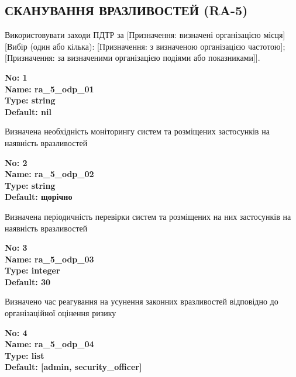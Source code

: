 \documentclass{article}
\begin{document}
\subsection{СКАНУВАННЯ ВРАЗЛИВОСТЕЙ (RA-5)}
Використовувати заходи ПДТР за [Призначення: визначені організацією місця] [Вибір (один або кілька): [Призначення: з визначеною організацією частотою]; [Призначення: за визначеними організацією подіями або показниками]].

\vspace{10pt}
{\footnotesize\bfseries
No: 1\\
Name: ra\_\allowbreak{}5\_\allowbreak{}odp\_\allowbreak{}01\\
Type: string\\
Default: nil
}

{\footnotesize Визначена необхідність моніторингу систем та розміщених застосунків на наявність вразливостей}


{\footnotesize\bfseries
No: 2\\
Name: ra\_\allowbreak{}5\_\allowbreak{}odp\_\allowbreak{}02\\
Type: string\\
Default: \textquotedbl{}щорічно\textquotedbl{}
}

{\footnotesize Визначена періодичність перевірки систем та розміщених на них застосунків на наявність вразливостей}


{\footnotesize\bfseries
No: 3\\
Name: ra\_\allowbreak{}5\_\allowbreak{}odp\_\allowbreak{}03\\
Type: integer\\
Default: 30
}

{\footnotesize Визначено час реагування на усунення законних вразливостей відповідно до організаційної оцінення ризику}


{\footnotesize\bfseries
No: 4\\
Name: ra\_\allowbreak{}5\_\allowbreak{}odp\_\allowbreak{}04\\
Type: list\\
Default: [\textquotedbl{}admin\textquotedbl{}, \textquotedbl{}security\_\allowbreak{}officer\textquotedbl{}]
}
\end{document}
